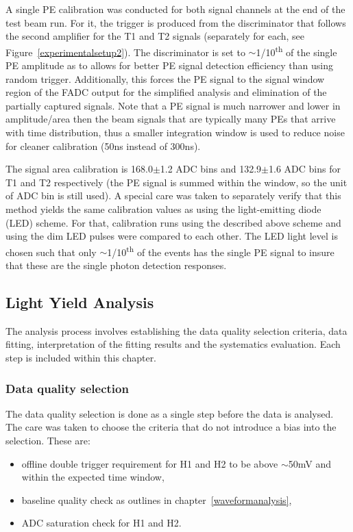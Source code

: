 \documentclass[preprint,12pt]{elsarticle}
\begin{document}
A single PE calibration was conducted for both signal channels at the end of the test beam run. For it, the trigger is produced from the discriminator that follows the second amplifier for the T1 and T2 signals (separately for each, see Figure~\ref{experimentalsetup2}). The discriminator is set to $\sim$1/10\textsuperscript{th} of the single PE amplitude as to	allows for better PE signal detection efficiency than using random trigger. Additionally, this forces the PE signal to the signal window region of the FADC output for the simplified analysis and elimination of the partially captured signals. Note that a PE signal is much narrower and lower in amplitude/area then the beam signals that are typically many PEs that arrive with time distribution, thus a smaller integration window is used to reduce noise for cleaner calibration (50ns instead of 300ns).

The signal area calibration is 168.0$\pm$1.2 ADC bins and 132.9$\pm$1.6 ADC bins for T1 and T2 respectively (the PE signal is summed within the window, so the unit of ADC bin is still used). A special care was taken to separately verify that this method yields the same calibration values as using the light-emitting diode (LED) scheme. For that, calibration runs using the described above scheme and using the dim LED pulses were compared to each other. The LED light level is chosen such that only $\sim$1/10\textsuperscript{th} of the events has the single PE signal to insure that these are the single photon detection responses.


\subsection{Light Yield Analysis}

The analysis process involves establishing the data quality selection criteria, data fitting, interpretation of the fitting results and the systematics evaluation. Each step is included within this chapter.

\subsubsection{Data quality selection}

The data quality selection is done as a single step before the data is analysed. The care was taken to choose the criteria that do not introduce a bias into the selection. These are:

\begin{itemize}
	\item offline double trigger requirement for H1 and H2 to be above $\sim$50mV and within the expected time window,
	\item baseline quality check as outlines in chapter~\ref{waveformanalysis},
	\item ADC saturation check for H1 and H2.
\end{itemize}
\end{document}
